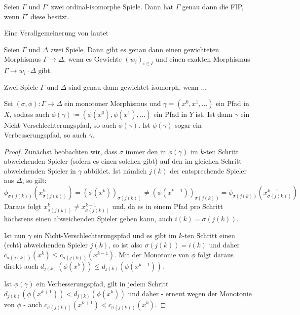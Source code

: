 \begin{kor}
	Seien $\Gamma$ und $\Gamma'$ zwei ordinal-isomorphe Spiele. Dann hat $\Gamma$ genau dann die FIP, wenn $\Gamma'$ diese besitzt.
\end{kor}

Eine Verallgemeinerung von  lautet

\begin{prop}
	Seien $\Gamma$ und $\Delta$ zwei Spiele. Dann gibt es genau dann einen gewichteten Morphismus $\Gamma \to \Delta$, wenn es Gewichte $(w_i)_{i\in I}$ und einen exakten Morphismus $\Gamma \to w_i \cdot \Delta$ gibt.
\end{prop}

\begin{kor}
	Zwei Spiele $\Gamma$ und $\Delta$ sind genau dann gewichtet isomorph, wenn ... 
\end{kor}


\begin{prop}
	Sei $(\sigma, \phi): \Gamma \to \Delta$ ein monotoner Morphismus und $\gamma = (x^0, x^1, \dots)$ ein Pfad in $X$, sodass auch $\phi(\gamma) \coloneqq (\phi(x^0), \phi(x^1), \dots)$ ein Pfad in $Y$ ist. Ist dann $\gamma$ ein Nicht-Verschlechterungspfad, so auch $\phi(\gamma)$. Ist $\phi(\gamma)$ sogar ein Verbesserungspfad, so auch $\gamma$.
\end{prop}

\begin{proof}
	Zunächst beobachten wir, dass $\sigma$ immer den in $\phi(\gamma)$ im $k$-ten Schritt abweichenden Spieler (sofern es einen solchen gibt) auf den im gleichen Schritt abweichenden Spieler in $\gamma$ abbildet. Ist nämlich $j(k)$ der entsprechende Spieler aus $\Delta$, so gilt:
	\[\phi_{\sigma(j(k))}\left(x_{\sigma(j(k))}^k\right) = \left(\phi(x^k)\right)_{\sigma(j(k))} \neq \left(\phi(x^{k-1})\right)_{\sigma(j(k))} = \phi_{\sigma(j(k))}\left(x_{\sigma(j(k))}^{k-1}\right)\]
	Daraus folgt $x_{\sigma(j(k))}^k \neq x_{\sigma(j(k))}^{k-1}$ und, da es in einem Pfad pro Schritt höchstens einen abweichenden Spieler geben kann, auch $i(k) = \sigma(j(k))$.
	
	Ist nun $\gamma$ ein Nicht-Verschlechterungspfad und es gibt im $k$-ten Schritt einen (echt) abweichenden Spieler $j(k)$, so ist also $\sigma(j(k)) = i(k)$ und daher $c_{\sigma(j(k))}(x^k) \leq c_{\sigma(j(k))}(x^{k-1})$. Mit der Monotonie von $\phi$ folgt daraus direkt auch $d_{j(k)}(\phi(x^k)) \leq d_{j(k)}(\phi(x^{k-1}))$.
	
	Ist $\phi(\gamma)$ ein Verbesserungspfad, gilt in jedem Schritt $d_{j(k)}(\phi(x^{k+1})) < d_{j(k)}(\phi(x^k))$ und daher - erneut wegen der Monotonie von $\phi$ - auch $c_{\sigma(j(k))}(x^{k+1}) < c_{\sigma(j(k))}(x^{k})$.
\end{proof}